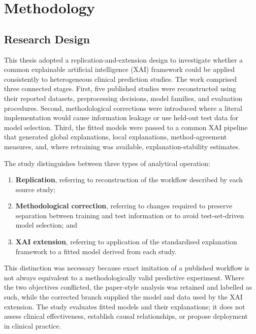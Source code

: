 \chapter*{\thechapter \quad Methodology}

\section{Research Design}

This thesis adopted a replication-and-extension design to investigate whether a common explainable artificial intelligence (XAI) framework could be applied consistently to heterogeneous clinical prediction studies. The work comprised three connected stages. First, five published studies were reconstructed using their reported datasets, preprocessing decisions, model families, and evaluation procedures. Second, methodological corrections were introduced where a literal implementation would cause information leakage or use held-out test data for model selection. Third, the fitted models were passed to a common XAI pipeline that generated global explanations, local explanations, method-agreement measures, and, where retraining was available, explanation-stability estimates.

The study distinguishes between three types of analytical operation:

\begin{enumerate}
    \item \textbf{Replication}, referring to reconstruction of the workflow described by each source study;
    \item \textbf{Methodological correction}, referring to changes required to preserve separation between training and test information or to avoid test-set-driven model selection; and
    \item \textbf{XAI extension}, referring to application of the standardised explanation framework to a fitted model derived from each study.
\end{enumerate}

This distinction was necessary because exact imitation of a published workflow is not always equivalent to a methodologically valid predictive experiment. Where the two objectives conflicted, the paper-style analysis was retained and labelled as such, while the corrected branch supplied the model and data used by the XAI extension. The study evaluates fitted models and their explanations; it does not assess clinical effectiveness, establish causal relationships, or propose deployment in clinical practice.

